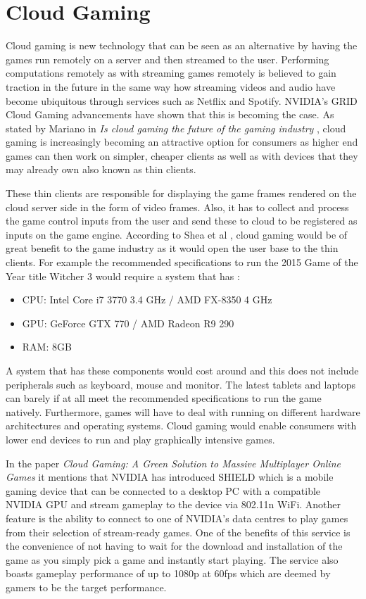 \section{Cloud Gaming}
Cloud gaming is new technology that can be seen as an alternative by having the games run remotely on a server and then streamed to the user. Performing computations remotely as with streaming games remotely is believed to gain traction in the future in the same way how streaming videos and audio have become ubiquitous through services such as Netflix and Spotify. NVIDIA's GRID Cloud Gaming advancements have shown that this is becoming the case. As stated by Mariano in \textit{Is cloud gaming the future of the gaming industry} \cite{mariano2015cloud}, cloud gaming is increasingly becoming an attractive option for consumers as higher end games can then work on simpler, cheaper clients as well as with devices that they may already own also known as thin clients.
\newline
\par
These thin clients are responsible for displaying the game frames rendered on the cloud server side in the form of video frames. Also, it has to collect and process the game control inputs from the user and send these to cloud to be registered as inputs on the game engine. According to Shea et al \cite{shea2013cloud}, cloud gaming would be of great benefit to the game industry as it would open the user base to the thin clients. For example the recommended specifications to run the 2015 Game of the Year title Witcher 3\cite{goty2015} would require a system that has \cite{witcher}:
\begin{itemize}
 \item CPU: Intel Core i7 3770 3.4 GHz / AMD FX-8350 4 GHz
 \item GPU: GeForce GTX 770 / AMD Radeon R9 290
 \item RAM: 8GB
\end{itemize}
A system that has these components would cost around  and this does not include peripherals such as keyboard, mouse and monitor. The latest tablets and laptops can barely if at all meet the recommended specifications to run the game natively. Furthermore, games will have to deal with running on different hardware architectures and operating systems. Cloud gaming would enable consumers with lower end devices to run and play graphically intensive games.
\newline
\par
In the paper \textit{Cloud Gaming: A Green Solution to Massive Multiplayer Online Games} \cite{chuah2014cloud} it mentions that NVIDIA has introduced SHIELD which is a mobile gaming device that can be connected to a desktop PC with a compatible NVIDIA GPU and stream gameplay to the device via 802.11n WiFi. Another feature is the ability to connect to one of NVIDIA's data centres to play games from their selection of stream-ready games. One of the benefits of this service is the convenience of not having to wait for the download and installation of the game as you simply pick a game and instantly start playing. The service also boasts gameplay performance of up to 1080p at 60fps which are deemed by gamers to be the target performance.


